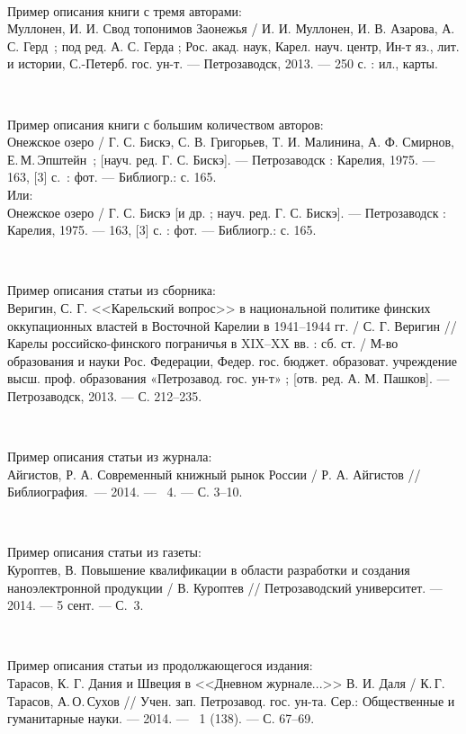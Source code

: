 \documentclass[utf8,12pt, coursreport]{G7-32}
\begin{document}
~

Пример описания книги с тремя авторами:\\
Муллонен, И. И. Свод топонимов Заонежья / И. И. Муллонен, И. В. Азарова, А. С. Герд~; под ред. А. С. Герда ; Рос. акад. наук, Карел. науч. центр, Ин-т яз., лит. и истории, С.-Петерб. гос. ун-т. --- Петрозаводск, 2013. --- 250 с. : ил., карты.

~

Пример описания книги с большим количеством авторов:\\
Онежское озеро / Г. С. Бискэ, С. В. Григорьев, Т. И. Малинина, А. Ф. Смирнов, Е.\,М.\,Эп\-штейн~; [науч. ред. Г. С. Бискэ]. --- Петрозаводск : Карелия, 1975. --- 163, [3] с.~: фот. --- Библиогр.: с. 165.\\
Или:\\
Онежское озеро / Г. С. Бискэ [и др. ; науч. ред. Г. С. Бискэ]. --- Петрозаводск : Карелия, 1975. --- 163, [3] с. : фот. --- Библиогр.: с. 165.

~

Пример описания статьи из сборника:\\
Веригин, С. Г. <<Карельский вопрос>> в национальной политике финских оккупационных властей в Восточной Карелии в 1941--1944 гг. / С. Г. Веригин // Карелы российско-финского пограничья в XIX--XX вв. : сб. ст. / М-во образования и науки Рос. Федерации, Федер. гос. бюджет. образоват. учреждение высш. проф. образования «Петрозавод. гос. ун-т» ; [отв. ред. А. М. Пашков]. --- Петрозаводск, 2013. --- С. 212--235. 

~

Пример описания статьи из журнала:\\
Айгистов, Р. А. Современный книжный рынок России / Р. А. Айгистов // Библиография.~--- 2014. --- \No~4. --- С. 3--10.

~

Пример описания статьи из газеты:\\
Куроптев, В. Повышение квалификации в области разработки и создания наноэлектронной продукции / В. Куроптев // Петрозаводский университет. --- 2014. --- 5 сент. --- С.~3.

~

Пример описания статьи из продолжающегося издания:\\ 
Тарасов, К. Г. Дания и Швеция в <<Дневном журнале...>> В. И. Даля / К.\,Г.\,Тарасов, А.\,О.\,Сухов // Учен. зап. Петрозавод. гос. ун-та. Сер.: Общественные и гуманитарные науки. --- 2014. --- \No~1 (138). --- С. 67--69. 
\end{document}

